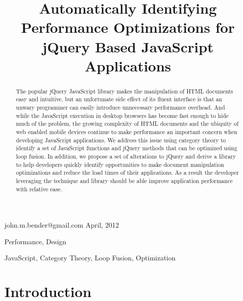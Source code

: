 \documentclass[preprint]{sigplanconf}
\begin{document}
\copyrightdata{[to be supplied]}


\title{Automatically Identifying Performance Optimizations for jQuery Based JavaScript Applications}

           {john.m.bender@gmail.com}
           {April, 2012}

\maketitle

\begin{abstract}
The popular \cite{bib:usage} jQuery JavaScript library makes the manipulation of HTML documents easy and intuitive, but an unfortunate side effect of its fluent interface is that an unwary programmer can easily introduce unnecessary performance overhead. And while the JavaScript execution in desktop browsers has become fast enough to hide much of the problem, the growing complexity of HTML documents and the ubiquity of web enabled mobile devices continue to make performance an important concern when developing JavaScript applications. We address this issue using category theory to identify a set of JavaScript functions and jQuery methods that can be optimized using loop fusion. In addition, we propose a set of alterations to jQuery and derive a library to help developers quickly identify opportunities to make document manipulation optimizations and reduce the load times of their applications. As a result the developer leveraging the technique and library should be able improve application performance with relative ease.
\end{abstract}


\terms
Performance, Design

\keywords
JavaScript, Category Theory, Loop Fusion, Optimization

\section{Introduction}
\end{document}
